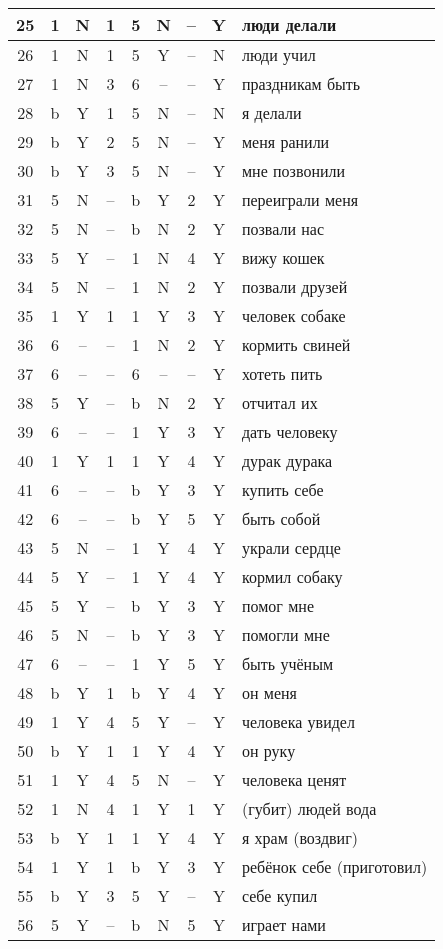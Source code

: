 \documentclass[main]{subfiles}
\begin{document}
\begin{longtable}[c]{|c|c|c|c|c|c|c|c|p{110px}|}
			25&1&N&1&5&N&--&Y&люди делали\\ \hline
			26&1&N&1&5&Y&--&N&люди учил\\ \hline
			27&1&N&3&6&--&--&Y&праздникам быть\\ \hline
			28&b&Y&1&5&N&--&N&я делали\\ \hline
			29&b&Y&2&5&N&--&Y&меня ранили\\ \hline
			30&b&Y&3&5&N&--&Y&мне позвонили \\ \hline
			31&5&N&--&b&Y&2&Y&переиграли меня\\ \hline
			32&5&N&--&b&N&2&Y&позвали нас\\ \hline
			33&5&Y&--&1&N&4&Y&вижу кошек\\ \hline
			34&5&N&--&1&N&2&Y&позвали друзей\\ \hline
			35&1&Y&1&1&Y&3&Y&человек собаке \\ \hline
			36&6&--&--&1&N&2&Y&кормить свиней\\ \hline
			37&6&--&--&6&--&--&Y&хотеть пить\\ \hline
			38&5&Y&--&b&N&2&Y&отчитал их \\ \hline
			39&6&--&--&1&Y&3&Y&дать человеку \\ \hline
			40&1&Y&1&1&Y&4&Y&дурак дурака \\ \hline
			41&6&--&--&b&Y&3&Y&купить себе\\ \hline
			42&6&--&--&b&Y&5&Y&быть собой\\ \hline
			43&5&N&--&1&Y&4&Y&украли сердце\\ \hline
			44&5&Y&--&1&Y&4&Y&кормил собаку \\ \hline
			45&5&Y&--&b&Y&3&Y&помог мне\\ \hline
			46&5&N&--&b&Y&3&Y&помогли мне\\ \hline
			47&6&--&--&1&Y&5&Y&быть учёным \\ \hline
			48&b&Y&1&b&Y&4&Y&он меня\\ \hline
			49&1&Y&4&5&Y&--&Y&человека увидел\\ \hline
			50&b&Y&1&1&Y&4&Y&он руку\\ \hline
			51&1&Y&4&5&N&--&Y&человека ценят\\ \hline
			52&1&N&4&1&Y&1&Y&(губит) людей вода\\ \hline
			53&b&Y&1&1&Y&4&Y&я храм (воздвиг) \\ \hline
			54&1&Y&1&b&Y&3&Y&ребёнок себе (приготовил) \\ \hline
			55&b&Y&3&5&Y&--&Y&себе купил \\ \hline
			56&5&Y&--&b&N&5&Y&играет нами\\ \hline

\end{longtable}
\end{document}
